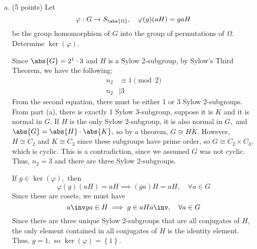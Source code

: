 \documentclass{article}
\begin{document}
\begin{itemize}
\begin{enumerate}[(a)]
			\item (5 points) Let
				\[\varphi:G\to S_{\abs{\Omega}}, \quad \varphi(g)(aH) = gaH\]
				be the group homomorphism of $G$ into the group of permutations of $\Omega.$ Determine $\ker(\varphi).$
				\begin{soln}
					Since $\abs{G}=2^1\cdot 3$ and $H$ is a Sylow 2-subgroup, by Sylow's Third Theorem, we have the following:
					\begin{align*}
						n_2 &\equiv 1\pmod 2 \\
						n_2 &\mid 3
					\end{align*}
					From the second equation, there must be either 1 or 3 Sylow 2-subgroups. From part (a), there is exactly 1 Sylow 3-subgroup, suppose it is $K$ and it is normal in $G.$ If $H$ is the only Sylow 2-subgroup, it is also normal in $G,$ and $\abs{G}=\abs{H}\cdot\abs{K},$ so by a theorem, $G\cong HK.$ However, $H\cong C_2$ and $K\cong C_3$ since these subgroups have prime order, so $G\cong C_2\times C_3,$ which is cyclic. This is a contradiction, since we assumed $G$ was not cyclic. Thus, $n_2=3$ and there are three Sylow 2-subgroups.

					If $g\in \ker(\varphi),$ then
					\[\varphi(g)(aH)=aH\implies (ga)H=aH, \quad \forall a\in G\]
					Since these are cosets, we must have
					\[a\inv ga\in H\implies g\in aHa\inv, \quad \forall a\in G\]
					Since there are three unique Sylow 2-subgroups that are all conjugates of $H,$ the only element contained in all conjugates of $H$ is the identity element. Thus, $g=1,$ so $\ker(\varphi)=\left\{ 1 \right\}.$
				\end{soln}
				
		\end{enumerate}

		\newpage


\end{itemize}
\end{document}
